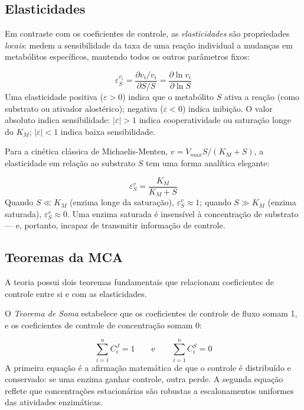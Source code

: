 \subsection{Elasticidades}

Em contraste com os coeficientes de controle, as \emph{elasticidades} são propriedades
\emph{locais}: medem a sensibilidade da taxa de uma reação individual a mudanças em
metabólitos específicos, mantendo todos os outros parâmetros fixos:

\begin{equation}
\varepsilon_S^{v_i} = \frac{\partial v_i / v_i}{\partial S / S} = \frac{\partial \ln v_i}{\partial \ln S}
\end{equation}
Uma elasticidade positiva ($\varepsilon > 0$) indica que o metabólito $S$ ativa a reação
(como substrato ou ativador alostérico); negativa ($\varepsilon < 0$) indica inibição.
O valor absoluto indica sensibilidade: $|\varepsilon| > 1$ indica cooperatividade ou
saturação longe do $K_M$; $|\varepsilon| < 1$ indica baixa sensibilidade.

Para a cinética clássica de Michaelis-Menten, $v = V_{max} S / (K_M + S)$, a elasticidade
em relação ao substrato $S$ tem uma forma analítica elegante:

\begin{equation}
\varepsilon_S^v = \frac{K_M}{K_M + S}
\end{equation}
Quando $S \ll K_M$ (enzima longe da saturação), $\varepsilon_S^v \approx 1$; quando
$S \gg K_M$ (enzima saturada), $\varepsilon_S^v \approx 0$. Uma enzima saturada é
insensível à concentração de substrato --- e, portanto, incapaz de transmitir informação
de controle.


\subsection{Teoremas da MCA}

A teoria possui dois teoremas fundamentais que relacionam coeficientes de controle
entre si e com as elasticidades.

O \emph{Teorema de Soma} estabelece que os coeficientes de controle de fluxo somam 1,
e os coeficientes de controle de concentração somam 0:

\begin{equation}
\sum_{i=1}^{n} C_i^J = 1 \qquad \text{e} \qquad \sum_{i=1}^{n} C_i^S = 0
\end{equation}
A primeira equação é a afirmação matemática de que o controle é distribuído e conservado:
se uma enzima ganhar controle, outra perde. A segunda equação reflete que concentrações
estacionárias são robustas a escalonamentos uniformes das atividades enzimáticas.

